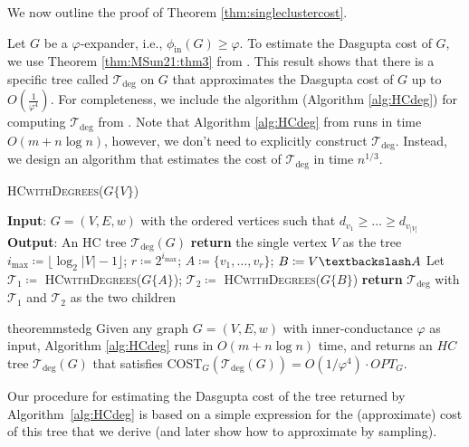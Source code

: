 \documentclass[letterpaper,11pt]{article}
\newcommand{\CT}{\text{COST}}
\theoremstyle{plain}
\theoremstyle{definition}
\theoremstyle{remark}
\begin{document}
We now outline the proof of Theorem \ref{thm:singleclustercost}.  

Let $G$ be a $\varphi$-expander, i.e., $\phi_{\text{in}}(G)\geq \varphi$. To estimate the Dasgupta cost of $G$, we use Theorem \ref{thm:MSun21:thm3} from \cite{MSun21}. This result shows that there is a specific tree called $\mathcal{T}_{\deg}$ on $G$ that approximates the Dasgupta cost of $G$ up to $O\left(\frac{1}{\varphi^4}\right)$.  For completeness, we include the algorithm (Algorithm \ref{alg:HCdeg}) for computing $\mathcal{T}_{\deg}$ from \cite{MSun21}. Note that Algorithm \ref{alg:HCdeg} from \cite{MSun21} runs in time $O(m+n\log{n})$, however, we don't need to explicitly construct $\mathcal{T}_{\deg}$. Instead,
we design an algorithm that estimates the cost of $\mathcal{T}_{\deg}$ in time $n^{1/3}$. 

\begin{algorithm}[H]
	\caption{\textsc{HCwithDegrees($G\{V\}$)} \cite{MSun21}}
	\label{alg:HCdeg}
	\begin{algorithmic}[1]
		\STATE \textbf{Input}: $G=(V, E, w)$ with the ordered vertices such that $d_{v_1}\geq \ldots \geq d_{v_{|V|}}$  
		\STATE \textbf{Output}: An HC tree $\mathcal{T}_{\deg}(G)$
		\STATE \textbf{return} the single vertex $V$ as the tree
		\ELSE
		\STATE $i_{\max} \coloneqq \lfloor \log_2{|V|-1} \rfloor$; $r \coloneqq 2^{i_{\max}}$; $A \coloneqq \{v_1,\ldots,v_r\}$; $B \coloneqq V\textbackslash A$
		\STATE Let $\mathcal{T}_1 \coloneqq $ \textsc{HCwithDegrees($G\{A\}$)}; $\mathcal{T}_2 \coloneqq $ \textsc{HCwithDegrees($G\{B\}$)}
		\STATE \textbf{return} $\mathcal{T}_{\deg}$ with $\mathcal{T}_1$ and $\mathcal{T}_2$ as the two children
		\ENDIF
	\end{algorithmic}
\end{algorithm}

\begin{restatable}{theorem}{mstedg}\label{thm:MSun21:thm3}
	Given any graph $G=(V, E, w)$ with inner-conductance $\varphi$ as input, Algorithm \ref{alg:HCdeg} runs in $O(m+n\log{n})$ time, and returns an $HC$ tree 
	$\mathcal{T}_{\deg}(G)$ that satisfies $\CT_G(\mathcal{T}_{\deg}(G))=O(1/\varphi^4) \cdot {OPT}_G$.  
\end{restatable}
Our procedure for estimating the Dasgupta cost of the tree returned by Algorithm~\ref{alg:HCdeg} is based on a simple expression for the (approximate) cost of this tree that we derive (and later show how to approximate by sampling). 
\end{document}
